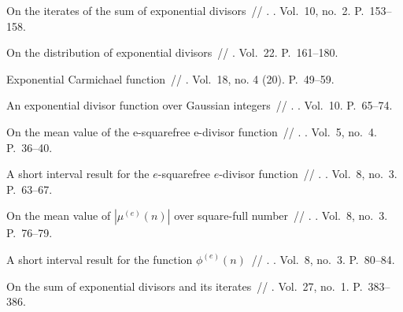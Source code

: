 \documentclass{article}
\begin{document}
\begin{thebibliography}{10}
 On the iterates of the sum of exponential
  divisors~// . \BibDash
{}. \BibDash
\newblock Vol.~10, no.~2. \BibDash
\newblock P.~153--158.

 On the distribution of exponential
  divisors~// 
  \BibDash
{}. \BibDash
\newblock Vol.~22. \BibDash
\newblock P.~161--180.

 Exponential Carmichael function~//  \BibDash
{}. \BibDash
\newblock Vol.~18, no. 4 (20). \BibDash
\newblock P.~49--59.

 An exponential divisor function over Gaussian
  integers~// . \BibDash
{}. \BibDash
\newblock Vol.~10. \BibDash
\newblock P.~65--74.

 On the mean value of the e-squarefree e-divisor
  function~// . \BibDash
{}. \BibDash
\newblock Vol.~5, no.~4. \BibDash
\newblock P.~36--40.

 A short interval result for the
  $e$-squarefree $e$-divisor function~// . \BibDash
{}. \BibDash
\newblock Vol.~8, no.~3. \BibDash
\newblock P.~63--67.

 On the mean value of $|\mu^{(e)}(n)|$ over
  square-full number~// . \BibDash
{}. \BibDash
\newblock Vol.~8, no.~3. \BibDash
\newblock P.~76--79.

 A short interval result for the function
  $\phi^{(e)}(n)$~// . \BibDash
{}. \BibDash
\newblock Vol.~8, no.~3. \BibDash
\newblock P.~80--84.

 On the sum of exponential divisors and its iterates~//
  \href{http://dx.doi.org/10.1007/BF01224690}{} \BibDash
{}. \BibDash
\newblock Vol.~27, no.~1. \BibDash
\newblock P.~383--386.


\end{thebibliography}
\end{document}
